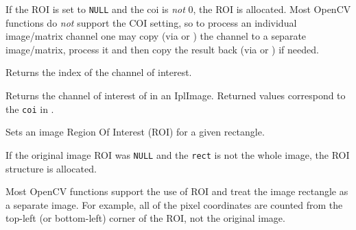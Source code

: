 \begin{description}
\end{description}

If the ROI is set to \texttt{NULL} and the coi is \textit{not} 0,
the ROI is allocated. Most OpenCV functions do \textit{not} support
the COI setting, so to process an individual image/matrix channel one
may copy (via  or ) the channel to a separate
image/matrix, process it and then copy the result back (via 
or ) if needed.

\label{GetImageCOI}

Returns the index of the channel of interest. 


\begin{description}
\end{description}

Returns the channel of interest of in an IplImage. Returned values correspond to the \texttt{coi} in .

\label{SetImageROI}

Sets an image Region Of Interest (ROI) for a given rectangle.


\begin{description}
\end{description}

If the original image ROI was \texttt{NULL} and the \texttt{rect} is not the whole image, the ROI structure is allocated.

Most OpenCV functions support the use of ROI and treat the image rectangle as a separate image. For example, all of the pixel coordinates are counted from the top-left (or bottom-left) corner of the ROI, not the original image.

